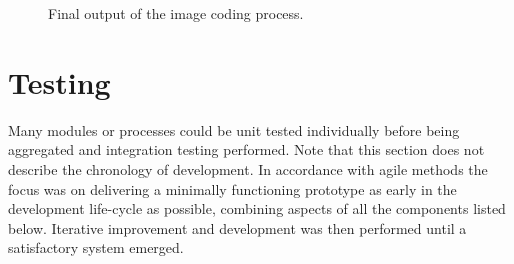     
\begin{figure}[htp]
  \begin{center}
  \end{center}
  \caption{Final output of the image coding process.}
  \label{scn:images}
\end{figure}
    

\FloatBarrier
\section{Testing}

Many modules or processes could be unit tested individually before being aggregated and integration testing performed. Note that this section does not describe the chronology of development. In accordance with agile methods the focus was on delivering a minimally functioning prototype as early in the development life-cycle as possible, combining aspects of all the components listed below. Iterative improvement and development was then performed until a satisfactory system emerged.


